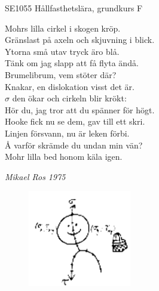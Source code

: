 \documentclass[a6paper,10pt]{article}
\begin{document}
\setlength{\oddsidemargin}{-0.37in}
\noindent
\begin{center}
\footnotesize SE1055 Hållfasthetslära, grundkurs F\\
\end{center}
Mohrs lilla cirkel i skogen kröp. \\
Gränslast på axeln och skjuvning i blick. \\
Ytorna små utav tryck äro blå. \\
Tänk om jag slapp att få flyta ändå. 
\vspace{5pt} \\
Brumelibrum, vem stöter där? \\
Knakar, en dislokation visst det är. \\
$\sigma$ den ökar och cirkeln blir krökt: \\
Hör du, jag tror att du spänner för högt. 
\vspace{5pt} \\
Hooke fick nu se dem, gav till ett skri. \\
Linjen försvann, nu är leken förbi. \\
Å varför skrämde du undan min vän? \\
Mohr lilla bed honom käla igen. 
\begin{flushright}
\textit{Mikael Ros 1975}
\end{flushright}

\begin{figure}[!h]
\centering
\includegraphics[width=0.4\textwidth]{Hallfgubbe.png}
\end{figure}
\end{document}
